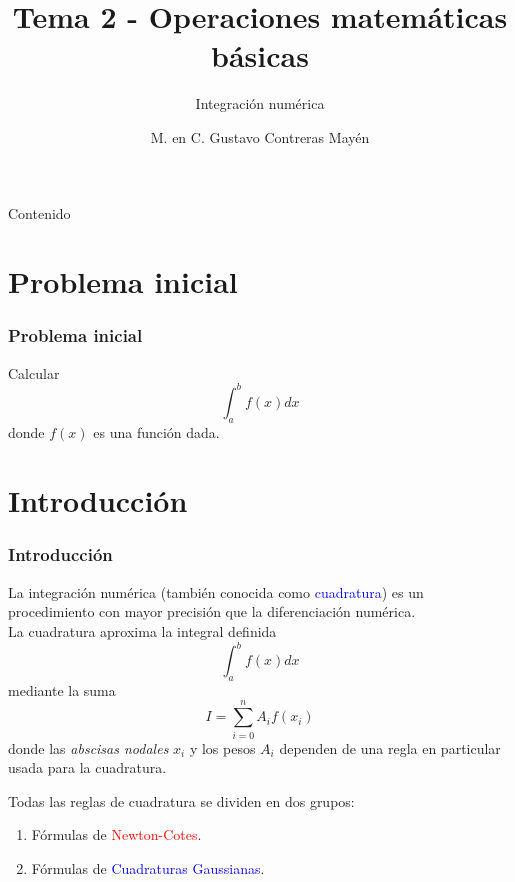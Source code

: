 


\title{Tema 2 - Operaciones matemáticas básicas}
\subtitle{Integración numérica}
\author{M. en C. Gustavo Contreras Mayén}
\maketitle
\fontsize{14}{14}\selectfont
{}
\begin{frame}{Contenido}
\tableofcontents[pausesections]
\end{frame}
\section{Problema inicial}
\begin{frame}
\frametitle{Problema inicial}
Calcular
\[\int_{a}^{b} f(x) dx\]
donde $f(x)$ es una función dada.
\end{frame}
\section{Introducción}
\begin{frame}
\frametitle{Introducción}
La integración numérica (también conocida como \textcolor{blue}{cuadratura}) es un procedimiento con mayor precisión que la diferenciación numérica.
\\
\bigskip
La cuadratura aproxima la integral definida
\[\int_{a}^{b} f(x) dx\]
mediante la suma
\[ I = \sum_{i=0}^{n} A_{i}f(x_{i})\]
\fontsize{12}{12}\selectfont
donde las \textit{abscisas nodales} $x_{i}$ y los pesos $A_{i}$ dependen de una regla en particular usada para la cuadratura.
\end{frame}
\begin{frame}
Todas las reglas de cuadratura se dividen en dos grupos:
	\begin{enumerate}
		\item Fórmulas de \textcolor{red}{Newton-Cotes}.
		\item Fórmulas de \textcolor{blue}{Cuadraturas Gaussianas}.
	\end{enumerate}
\end{frame}
